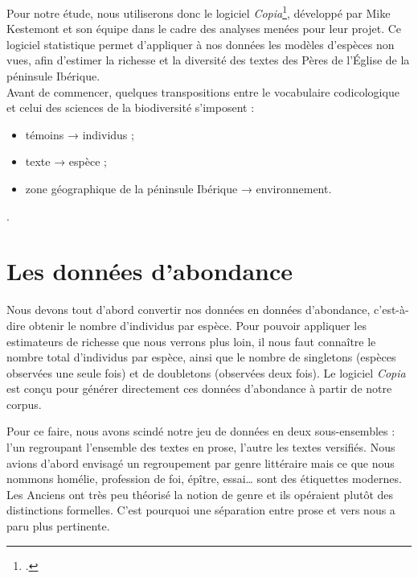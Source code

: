 \documentclass[a4paper,twoside,12pt]{book}
\begin{document}
Pour notre étude, nous utiliserons donc le logiciel \textit{Copia}\footcite{copia_github}, développé par Mike Kestemont et son équipe dans le cadre des analyses menées pour leur projet. Ce logiciel statistique permet d’appliquer à nos données les modèles d’espèces non vues, afin d’estimer la richesse et la diversité des textes des Pères de l’Église de la péninsule Ibérique. \\


Avant de commencer, quelques transpositions entre le vocabulaire codicologique et celui des sciences de la biodiversité s’imposent :
\begin{itemize}
	\item témoins → individus ;
	\item texte → espèce ;
	\item zone géographique de la péninsule Ibérique → environnement.
\end{itemize}

. %




\section{Les données d'abondance}


Nous devons tout d’abord convertir nos données en données d’abondance, c’est-à-dire obtenir le nombre d'individus par espèce. Pour pouvoir appliquer les estimateurs de richesse que nous verrons plus loin, il nous faut connaître le nombre total d’individus par espèce, ainsi que le nombre de singletons (espèces observées une seule fois) et de doubletons (observées deux fois). Le logiciel \textit{Copia} est conçu pour générer directement ces données d’abondance à partir de notre corpus.

Pour ce faire, nous avons scindé notre jeu de données en deux sous-ensembles : l’un regroupant l’ensemble des textes en prose, l’autre les textes versifiés.  Nous avions d’abord envisagé un regroupement par genre littéraire mais ce que nous nommons homélie, profession de foi, épître, essai… sont des étiquettes modernes. Les Anciens ont très peu théorisé la notion de genre et ils opéraient plutôt des distinctions formelles. C’est pourquoi une séparation entre prose et vers nous a paru plus pertinente.
\end{document}
